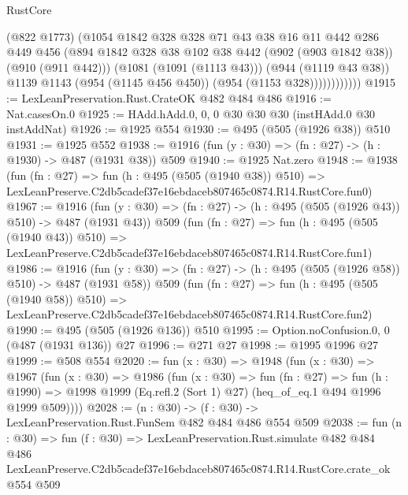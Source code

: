 \begin{lexlean}{RustCore}
\begin{coremodule}
                      (@822 @1773)
                      (@1054
                        @1842
                        @328
                        @328
                        @71
                        @43
                        @38
                        @16
                        @11
                        @442
                        @286
                        @449
                        @456
                        (@894
                          @1842
                          @328
                          @38
                          @102
                          @38
                          @442
                          (@902 (@903 @1842 @38))
                          (@910 (@911 @442)))
                        (@1081 (@1091 (@1113 @43)))
                        (@944 (@1119 @43 @38))
                        @1139
                        @1143
                        (@954 (@1145 @456 @450))
                        (@954 (@1153 @328))))))))))))
@1915 := LexLeanPreservation.Rust.CrateOK @482 @484 @486
@1916 := Nat.casesOn.{0}
@1925 := HAdd.hAdd.{0, 0, 0} @30 @30 @30 (instHAdd.{0} @30 instAddNat)
@1926 := @1925 @554
@1930 := @495 (@505 (@1926 @38)) @510
@1931 := @1925 @552
@1938 := @1916 (fun (y : @30) => (fn : @27) -> (h : @1930) -> @487 (@1931 @38)) @509
@1940 := @1925 Nat.zero
@1948 := @1938
    (fun (fn : @27) =>
    fun (h : @495 (@505 (@1940 @38)) @510) =>
    LexLeanPreserve.C2db5cadef37e16ebdaceb807465c0874.R14.RustCore.fun0)
@1967 := @1916
    (fun (y : @30) => (fn : @27) -> (h : @495 (@505 (@1926 @43)) @510) -> @487 (@1931 @43))
    @509
    (fun (fn : @27) =>
    fun (h : @495 (@505 (@1940 @43)) @510) =>
    LexLeanPreserve.C2db5cadef37e16ebdaceb807465c0874.R14.RustCore.fun1)
@1986 := @1916
    (fun (y : @30) => (fn : @27) -> (h : @495 (@505 (@1926 @58)) @510) -> @487 (@1931 @58))
    @509
    (fun (fn : @27) =>
    fun (h : @495 (@505 (@1940 @58)) @510) =>
    LexLeanPreserve.C2db5cadef37e16ebdaceb807465c0874.R14.RustCore.fun2)
@1990 := @495 (@505 (@1926 @136)) @510
@1995 := Option.noConfusion.{0, 0} (@487 (@1931 @136)) @27
@1996 := @271 @27
@1998 := @1995 @1996 @27
@1999 := @508 @554
@2020 := fun (x : @30) =>
  @1948
    (fun (x : @30) =>
    @1967
      (fun (x : @30) =>
      @1986
        (fun (x : @30) =>
        fun (fn : @27) =>
        fun (h : @1990) =>
        @1998 @1999 (Eq.refl.{2} (Sort 1) @27) (heq_of_eq.{1} @494 @1996 @1999 @509))))
@2028 := (n : @30) -> (f : @30) -> LexLeanPreservation.Rust.FunSem @482 @484 @486 @554 @509
@2038 := fun (n : @30) =>
  fun (f : @30) =>
  LexLeanPreservation.Rust.simulate
    @482
    @484
    @486
    LexLeanPreserve.C2db5cadef37e16ebdaceb807465c0874.R14.RustCore.crate_ok
    @554
    @509
\end{coremodule}
\end{lexlean}

